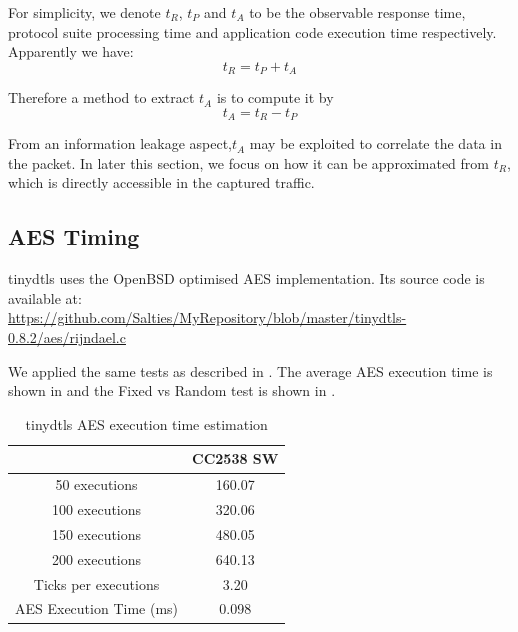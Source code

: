 For simplicity, we denote $t_R$, $t_P$ and $t_A$ to be the observable response time, protocol suite processing time and application code execution time respectively. Apparently we have:
\begin{equation}
t_R = t_P + t_A
\end{equation}

Therefore a method to extract $t_A$ is to compute it by 
\begin{equation} \label{Eq: t_A}
t_A = t_R - t_P
\end{equation}

From an information leakage aspect,$t_A$ may be exploited to correlate the data in the packet. In later this section, we focus on how it can be approximated from $t_R$, which is directly accessible in the captured traffic.

\subsection{AES Timing} \label{tinydtls AES Timing}

tinydtls uses the OpenBSD optimised AES implementation. Its source code is available at:\\ 
\url{https://github.com/Salties/MyRepository/blob/master/tinydtls-0.8.2/aes/rijndael.c}

We applied the same tests as described in . The average AES execution time is shown in  and the Fixed vs Random test is shown in .

\begin{table}[ht!]
	\center
	\begin{tabular}{|c|c|}
		\hline
		                        & CC2538 SW \\ \hline
		50 executions           & 160.07          \\ \hline
		100 executions          & 320.06          \\ \hline
		150 executions          & 480.05          \\ \hline
		200 executions          & 640.13          \\ \hline
		Ticks per executions    & 3.20            \\ \hline
		AES Execution Time (ms) & 0.098           \\ \hline
	\end{tabular}
	\caption{tinydtls AES execution time estimation}
	\label{Tbl: tinydtls AES execution time estimation}
\end{table}

